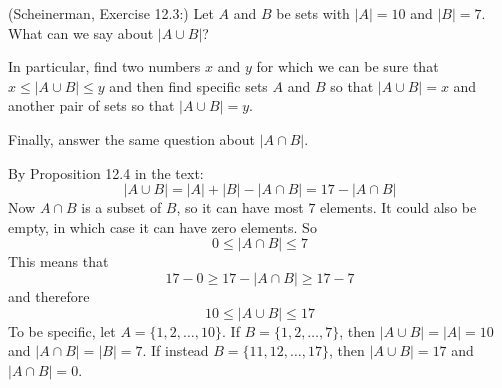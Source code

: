 \documentclass{article}
\theoremstyle{definition}
\begin{document}
\begin{question}
    (Scheinerman, Exercise 12.3:)
    Let $A$ and $B$ be sets with $|A| = 10$ and $|B| = 7$.
    What can we say about $|A\cup B|$?
    
    In particular, find two numbers $x$ and $y$ for which we can be sure that $x \leq |A \cup B| \leq y$ and then find specific sets $A$ and $B$ so that $|A \cup B| = x$ and another pair of sets so that $|A \cup B| = y$.
    
    Finally, answer the same question about $|A\cap B|$.  
\end{question}
\begin{solution}
    By Proposition 12.4 in the text:
    \[
        |A\cup B| = |A| + |B| - | A \cap B| = 17 - |A \cap B|
    \]
    Now $A \cap B$ is a subset of $B$, so it can have most $7$ elements.
    It could also be empty, in which case it can have zero elements.
    So
    \[
        0 \leq |A \cap B| \leq 7
    \]
    This means that 
    \[
       17-0 \geq 17 - |A \cap B| \geq 17-7
    \]
    and therefore 
    \[
        10 \leq |A \cup B| \leq 17
    \]
    To be specific, let $A = \{1,2,\dots,10\}$.
    If $B = \{1,2,\dots,7\}$, then $|A \cup B| = |A| =10$ and $|A \cap B| = |B| = 7$.
    If instead $B = \{11,12,\dots,17\}$, then $|A \cup B| = 17$ and $|A \cap B| = 0$.
\end{solution}
\end{document}
